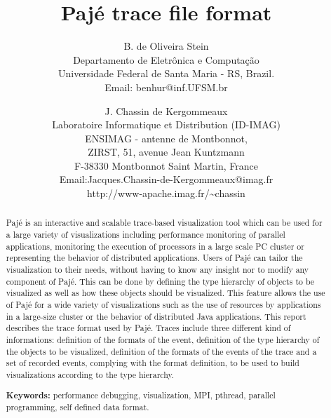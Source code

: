 \documentclass[11pt,twoside]{report}
\title{Pajé trace file format}
\author{B. de Oliveira Stein\\ 
Departamento de Eletr\^onica e Computa\c{c}\~ao\\
Universidade Federal de Santa Maria - RS, Brazil.\\
Email: benhur@inf.UFSM.br\\
\and
J. Chassin de Kergommeaux\\
Laboratoire Informatique et Distribution (ID-IMAG)\\
ENSIMAG - antenne de Montbonnot,\\ ZIRST, 51, avenue Jean Kuntzmann\\
F-38330 Montbonnot Saint Martin, France \\ 
Email:Jacques.Chassin-de-Kergommeaux@imag.fr\\
http://www-apache.imag.fr/\~\/chassin
}
\begin{document}
\maketitle

\begin{abstract}
  
  Pajé is an interactive and scalable trace-based visualization tool
  which can be used for a large variety of visualizations including
  performance monitoring of parallel applications, monitoring the
  execution of processors in a large scale PC cluster or representing
  the behavior of distributed applications. Users of Pajé can tailor
  the visualization to their needs, without having to know any insight
  nor to modify any component of Pajé. This can be done by defining
  the type hierarchy of objects to be visualized as well as how these
  objects should be visualized. This feature allows the use of Pajé
  for a wide variety of visualizations such as the use of resources by
  applications in a large-size cluster or the behavior of distributed
  Java applications.  This report describes the trace format used by
  Pajé. Traces include three different kind of informations:
  definition of the formats of the event, definition of the type
  hierarchy of the objects to be visualized, definition of the formats
  of the events of the trace and a set of recorded events, complying
  with the format definition, to be used to build visualizations
  according to the type hierarchy.

 \textbf{Keywords:} performance debugging, visualization, MPI, pthread, 
parallel programming, self defined data format.

  
\end{abstract}

\tableofcontents

%

%
\end{document}
